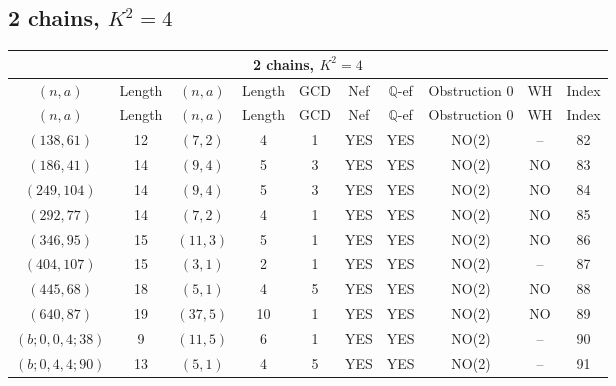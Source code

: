 \subsection{2 chains, $K^2 = 4$}
\begin{longtable}{|c|c|c|c|c|c|c|c|c|c|}
\hline
\multicolumn{10}{|c|}{2 chains, $K^2 = 4$}\\
\hline
$(n,a)$ & Length & $(n,a)$ & Length & GCD & Nef & $\mathbb Q$-ef & Obstruction 0 & WH & Index\\
\hline
\endfirsthead

\hline
$(n,a)$ & Length & $(n,a)$ & Length & GCD & Nef & $\mathbb Q$-ef & Obstruction 0 & WH & Index\\
\hline
\endhead
\hline
\endfoot

$(138, 61)$ & 12 & $(7, 2)$ & 4 & 1 & YES & YES & NO(2) & -- & 82\\
$(186, 41)$ & 14 & $(9, 4)$ & 5 & 3 & YES & YES & NO(2) & NO & 83\\
$(249, 104)$ & 14 & $(9, 4)$ & 5 & 3 & YES & YES & NO(2) & NO & 84\\
$(292, 77)$ & 14 & $(7, 2)$ & 4 & 1 & YES & YES & NO(2) & NO & 85\\
$(346, 95)$ & 15 & $(11, 3)$ & 5 & 1 & YES & YES & NO(2) & NO & 86\\
$(404, 107)$ & 15 & $(3, 1)$ & 2 & 1 & YES & YES & NO(2) & -- & 87\\
$(445, 68)$ & 18 & $(5, 1)$ & 4 & 5 & YES & YES & NO(2) & NO & 88\\
$(640, 87)$ & 19 & $(37, 5)$ & 10 & 1 & YES & YES & NO(2) & NO & 89\\
$(b; 0, 0, 4; 38)$ & 9 & $(11, 5)$ & 6 & 1 & YES & YES & NO(2) & -- & 90\\
$(b; 0, 4, 4; 90)$ & 13 & $(5, 1)$ & 4 & 5 & YES & YES & NO(2) & -- & 91
\end{longtable}
